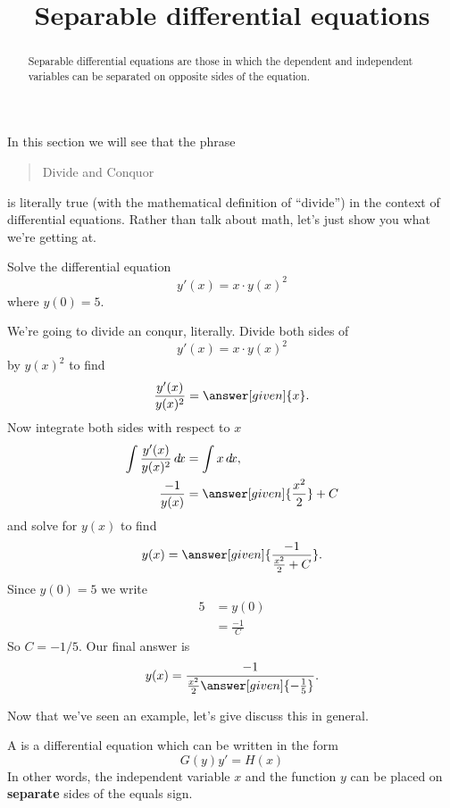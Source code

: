 \documentclass{ximera}
\title[Dig-In:]{Separable differential equations}
\begin{document}
\begin{abstract}
  Separable differential equations are those in which the dependent and independent variables can be separated on opposite sides of the equation.
\end{abstract}
\maketitle

In this section we will see that the phrase
\begin{quote}
  Divide and Conquor
\end{quote}
is literally true (with the mathematical definition of ``divide'') in
the context of differential equations. Rather than talk about math,
let's just show you what we're getting at.

\begin{example}
  Solve the differential equation
  \[
  y'(x) = x\cdot y(x)^2
  \]
  where $y(0)= 5$.
  \begin{explanation}
    We're going to divide an conqur, literally. Divide both sides of
    \[
    y'(x) = x\cdot y(x)^2
    \]
    by $y(x)^2$ to find
    \[
    \frac{y'(x)}{y(x)^2} = \answer[given]{x}.
    \]
    Now integrate both sides with respect to $x$
    \begin{align*}
      \int \frac{y'(x)}{y(x)^2} \d x &= \int x \d x,\\
      \frac{-1}{y(x)} &= \answer[given]{\frac{x^2}{2}}+C
    \end{align*}
    and solve for $y(x)$ to find
    \[
    y(x) = \answer[given]{\frac{-1}{\frac{x^2}{2}+C}}.
    \]
    Since $y(0) =5$ we write
    \begin{align*}
    5&= y(0)\\
    &=\frac{-1}{C}
    \end{align*}
    So $C= -1/5$. Our final answer is
    \[
    y(x) = \frac{-1}{\frac{x^2}{2} \answer[given]{-\frac{1}{5}}}.
    \]
  \end{explanation}
\end{example}

Now that we've seen an example, let's give discuss this in general.

\begin{definition}
  A  is a differential equation
  which can be written in the form
  \[
  G(y) y' = H(x)
  \]
  In other words, the independent variable $x$ and the function $y$
  can be placed on \textbf{separate} sides of the equals sign.
\end{definition}
\end{document}
